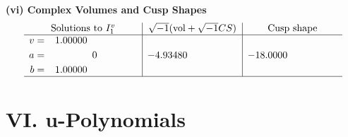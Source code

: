 \documentclass[1p]{elsarticle_modified}
\theoremstyle{definition}
\newcommand{\I}{\sqrt{-1}}
\begin{document}
\newpage\flushleft \textbf{(vi) Complex Volumes and Cusp Shapes}
$$\begin{array}{c|c|c}  
\text{Solutions to }I^v_{1}& \I (\text{vol} + \sqrt{-1}CS) & \text{Cusp shape}\\
 \hline 
\begin{aligned}
v &= \phantom{-}1.00000\phantom{ +0.000000I} \\
a &= \phantom{-0.000000 } 0 \\
b &= \phantom{-}1.00000\phantom{ +0.000000I}\end{aligned}
 & -4.93480\phantom{ +0.000000I} & -18.0000\phantom{ +0.000000I}\\
 \hline 
 \end{array}$$\newpage
\newpage\renewcommand{\arraystretch}{1}
\centering \section*{ VI. u-Polynomials}
\end{document}
